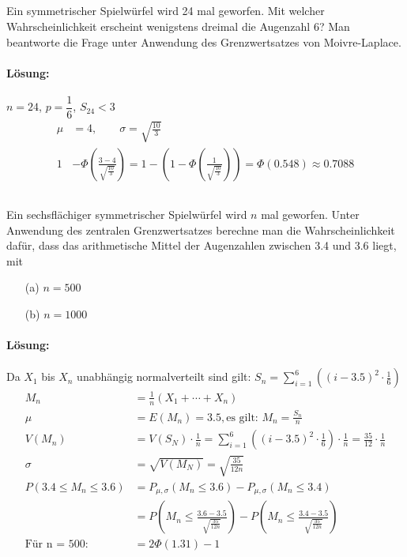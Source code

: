 \documentclass[ngerman]{scrartcl}
\begin{document}
\subsection{}
Ein symmetrischer Spielwürfel wird 24 mal geworfen. Mit welcher Wahrscheinlichkeit erscheint wenigstens dreimal die Augenzahl 6? Man beantworte die Frage unter Anwendung des Grenzwertsatzes von Moivre-Laplace.
\paragraph{Lösung:}
$n = 24$, $p = \dfrac{1}{6}$, $S_{24} < 3$
\begin{align*}
\mu &= 4,\qquad \sigma = \sqrt{\frac{10}{3}}\\
1 &- \Phi\left(\frac{3 - 4}{\sqrt{\frac{10}{3}}}\right) = 1 - \left(1 - \Phi\left( \frac{1}{\sqrt{\frac{10}{3}}}  \right)\right) = \Phi(0.548) \approx 0.7088
\end{align*}
\subsection{}
Ein sechsflächiger symmetrischer Spielwürfel wird $n$ mal geworfen. Unter Anwendung des zentralen Grenzwertsatzes berechne man die Wahrscheinlichkeit dafür, dass das arithmetische Mittel der Augenzahlen zwischen 3.4 und 3.6 liegt, mit 
\begin{enumerate}
\item[(a)] $n =500$
\item[(b)] $n =1000$
\end{enumerate}
\paragraph{Lösung:}
Da $X_1$ bis $X_n$ unabhängig normalverteilt sind gilt: $S_n = \sum_{i=1}^{6}\left( (i - 3.5)^{2}\cdot \frac{1}{6}\right)$
\begin{align*}
M_n &= \frac{1}{n}(X_1 + \cdots + X_n)\\
\mu &= E(M_n) = 3.5, \text{es gilt: } M_n = \frac{S_n}{n}\\
V(M_n) &= V(S_N)\cdot \frac{1}{n} = \sum_{i=1}^{6}\left( (i - 3.5)^{2}\cdot \frac{1}{6}\right) \cdot\frac{1}{n}= \frac{35}{12}\cdot \frac{1}{n}\\
\sigma &= \sqrt{V(M_N)} = \sqrt{\frac{35}{12n}}\\
P(3.4 \le M_n \le 3.6) &= P_{\mu, \sigma}(M_n\le 3.6) - P_{\mu, \sigma}(M_n \le 3.4) \\
&= P\left(M_n \le \frac{3.6 - 3.5}{\sqrt{\frac{35}{12n}}}\right) - P\left(M_n \le \frac{3.4 - 3.5}{\sqrt{\frac{35}{12n}}}\right) \\
\text{Für n = 500: }&= 2 \Phi \left(1.31\right) - 1
\end{align*}
\end{document}
